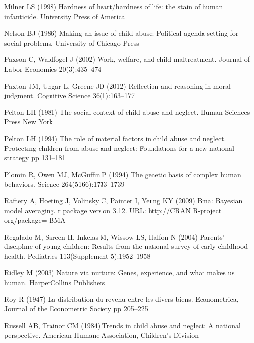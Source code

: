 \begin{thebibliography}{50}
Milner LS (1998) Hardness of heart/hardness of life: the stain of human
  infanticide. University Press of America

Nelson BJ (1986) Making an issue of child abuse: Political agenda setting for
  social problems. University of Chicago Press

Paxson C, Waldfogel J (2002) Work, welfare, and child maltreatment. Journal of
  Labor Economics 20(3):435--474

Paxton JM, Ungar L, Greene JD (2012) Reflection and reasoning in moral
  judgment. Cognitive Science 36(1):163--177

Pelton LH (1981) The social context of child abuse and neglect. Human Sciences
  Press New York

Pelton LH (1994) The role of material factors in child abuse and neglect.
  Protecting children from abuse and neglect: Foundations for a new national
  strategy pp 131--181

Plomin R, Owen MJ, McGuffin P (1994) The genetic basis of complex human
  behaviors. Science 264(5166):1733--1739

Raftery A, Hoeting J, Volinsky C, Painter I, Yeung KY (2009) Bma: Bayesian
  model averaging. r package version 3.12. URL: http://CRAN R-project
  org/package= BMA

Regalado M, Sareen H, Inkelas M, Wissow LS, Halfon N (2004) Parents' discipline
  of young children: Results from the national survey of early childhood
  health. Pediatrics 113(Supplement 5):1952--1958

Ridley M (2003) Nature via nurture: Genes, experience, and what makes us human.
  HarperCollins Publishers

Roy R (1947) La distribution du revenu entre les divers biens. Econometrica,
  Journal of the Econometric Society pp 205--225

Russell AB, Trainor CM (1984) Trends in child abuse and neglect: A national
  perspective. American Humane Association, Children's Division


\end{thebibliography}
